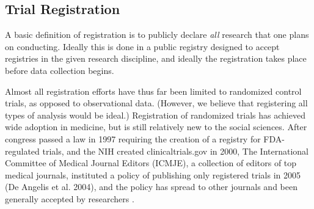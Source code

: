 \documentclass[12pt] {article}
\begin{document}
\subsection{Trial Registration}\label{trial-registration}

A basic definition of registration is to publicly declare \emph{all}
research that one plans on conducting. Ideally this is done in a public
registry designed to accept registries in the given research discipline,
and ideally the registration takes place before data collection begins.

Almost all registration efforts have thus far been limited to randomized
control trials, as opposed to observational data. (However, we believe
that registering all types of analysis would be ideal.) Registration of
randomized trials has achieved wide adoption in medicine, but is still
relatively new to the social sciences. After congress passed a law in
1997 requiring the creation of a registry for FDA-regulated trials, and
the NIH created clinicaltrials.gov in 2000, The International Committee
of Medical Journal Editors (ICMJE), a collection of editors of top
medical journals, instituted a policy of publishing only registered
trials in 2005 (De Angelis et al. 2004), and the policy has spread to
other journals and been generally accepted by researchers \citep{laine_clinical_2007}.
\end{document}
